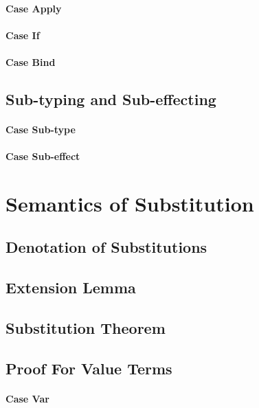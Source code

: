 {    \paragraph{Case Apply}
        
    \paragraph{Case If}
       
    \paragraph{Case Bind}
        
    \subsection{Sub-typing and Sub-effecting}
    \paragraph{Case Sub-type}
        
    \paragraph{Case Sub-effect}
    
    \section{Semantics of Substitution}
    \subsection{Denotation of Substitutions}
    
    \subsection{Extension Lemma}
   
    \subsection{Substitution Theorem}

    \subsection{Proof For Value Terms}
    \paragraph{Case Var}
    
}
